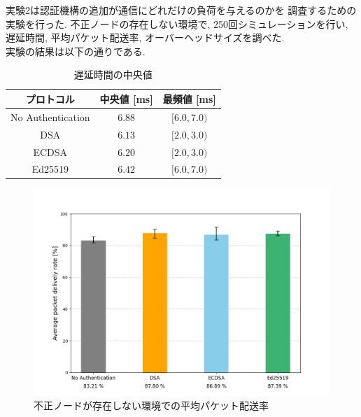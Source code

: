 実験2は認証機構の追加が通信にどれだけの負荷を与えるのかを
調査するための実験を行った. 
不正ノードの存在しない環境で, 250回シミュレーションを行い, 
遅延時間, 平均パケット配送率, オーバーヘッドサイズを調べた. \\
\indent 実験の結果は以下の通りである. \\

\begin{longtable}{ccc}
  \caption{遅延時間の中央値}
  \label{tab:exp2_delay} \\
  \endfirsthead
  \hline
  \multicolumn{1}{c}{プロトコル} &
  \multicolumn{1}{c}{中央値 [ms]} &
  \multicolumn{1}{c}{最頻値 [ms]} \\ \hline \hline
  No Authentication & $6.88$ & $[6.0, 7.0)$ \\
  DSA & $6.13$ & $[2.0, 3.0)$ \\
  ECDSA & $6.20$ & $[2.0, 3.0)$ \\
  Ed25519 & $6.42$ & $[6.0, 7.0)$ \\ \hline
\end{longtable}

\begin{figure}
  \centering
  \includegraphics[width=1\textwidth]{figures/exp2_pdr.png}
  \caption{不正ノードが存在しない環境での平均パケット配送率}
  \label{fig:exp2_pdr}
\end{figure}

